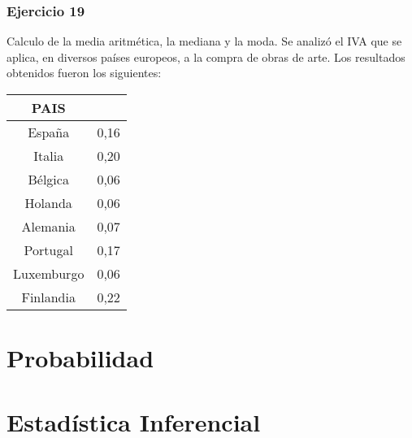 \documentclass[11pt,letterpaper]{report}
\begin{document}
      \subsection*{Ejercicio 19}
        Calculo de la media aritmética, la mediana y la moda. Se analizó el IVA que se aplica, en diversos países europeos, a la compra de obras de arte. Los resultados obtenidos fueron los siguientes:
        \begin{table}[!h]
            \begin{tabular}{|c|c|}
                \hline
                PAIS& \\
                \hline
                España &0,16\\
                Italia &0,20\\
                Bélgica& 0,06\\
                Holanda& 0,06\\
                Alemania& 0,07\\
                Portugal& 0,17\\
                Luxemburgo& 0,06\\
                Finlandia& 0,22\\
                \hline
            \end{tabular}
        \end{table}

  \chapter{Probabilidad}
  \chapter{Estad\'istica Inferencial}
\end{document}
